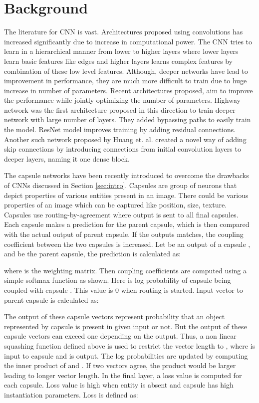 \documentclass{bmvc2k}
\begin{document}
\section{Background }
\label{sec:relatedwork}
The literature for CNN is vast. Architectures proposed using convolutions has increased significantly due to increase in computational power. The CNN tries to learn in a hierarchical manner from lower to higher layers where lower layers learn basic features like edges and higher layers learns complex features by combination of these low level features. Although, deeper networks have lead to improvement in performance, they are much more difficult to train due to huge increase in number of parameters. Recent architectures proposed, aim to improve the performance while jointly optimizing the number of parameters. Highway network \cite{highway} was the first architecture proposed in this direction to train deeper network with large number of layers. They added bypassing paths to easily train the model. ResNet \cite{resnet} model improves training by adding residual connections. Another such network proposed by Huang et. al. \cite{densenet} created a novel way of adding skip connections by introducing connections from initial convolution layers to deeper layers, naming it one dense block. 



The capsule networks \cite{capsnet} have been recently introduced to overcome the drawbacks of CNNs discussed in Section \ref{sec:intro}. Capsules are group of neurons that depict properties of various entities present in an image. There could be various properties of an image which can be captured like position, size, texture. Capsules use routing-by-agreement where output is sent to all final capsules. Each capsule makes a prediction for the parent capsule, which is then compared with the actual output of parent capsule. If the outputs matches, the coupling coefficient between the two capsules is increased. Let  be an output of a capsule , and  be the parent capsule, the prediction is calculated as:




where  is the weighting matrix. Then coupling coefficients  are computed using a simple softmax function as shown. Here  is log probability of capsule  being coupled with capsule . This value is 0 when routing is started. Input vector to parent capsule  is calculated as:
\vspace{-7px}

The output of these capsule vectors represent probability that an object represented by capsule is present in given input or not. But the output of these capsule vectors can exceed one depending on the output. Thus, a non linear squashing function defined above is used to restrict the vector length to ,
where  is input to capsule  and  is output. The log probabilities are updated by computing the inner product of  and . If two vectors agree, the product would be larger leading to longer vector length. In the final layer, a loss value is computed for each capsule. Loss value is high when entity is absent and capsule has high instantiation parameters. Loss is defined as:
\end{document}
